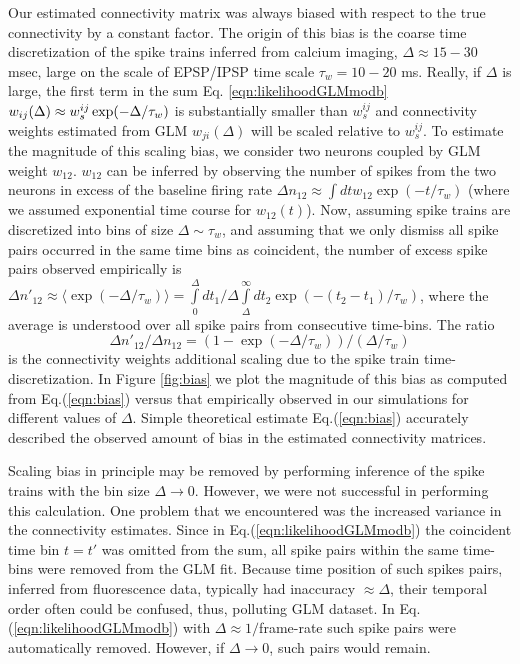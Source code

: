 Our estimated connectivity matrix was always biased with respect to the true connectivity by a constant factor. The origin of this bias is the coarse time discretization of the spike trains inferred from calcium imaging, $\Delta \approx 15-30$ msec, large on the scale of EPSP/IPSP time scale $\tau_w = 10-20$ ms. Really, if $\Delta$ is large, the first term in the sum Eq. \ref{eqn:likelihoodGLMmodb} $w_{ij}(\Delta)\approx w^{ij}_s\exp(-\Delta/\tau_w)$ is substantially smaller than $w^{ij}_s$ and connectivity weights estimated from GLM $w_{ji}(\Delta)$ will be scaled relative to $w_s^{ij}$.
To estimate the magnitude of this scaling bias, we consider two neurons coupled by GLM weight $w_{12}$. $w_{12}$ can be inferred by observing the number of spikes from the two neurons in excess of the baseline firing rate $\Delta n_{12} \approx \int dt w_{12} \exp(-t/\tau_w)$ (where we assumed exponential time course for $w_{12}(t)$). Now, assuming spike trains are discretized into bins of size $\Delta \sim \tau_w$, and assuming that we only dismiss all spike pairs occurred in the same time bins as coincident, the number of excess spike pairs observed empirically is $\Delta n'_{12} \approx \langle \exp(-\Delta/\tau_w) \rangle = \int\limits_0^\Delta {dt_1}/{\Delta} \int\limits_{\Delta}^\infty dt_2 \exp(-(t_2-t_1)/\tau_w)$, where the average is understood over all spike pairs from consecutive time-bins. The ratio
\begin{equation}\label{eqn:bias}
\Delta n'_{12}/\Delta n_{12}=(1-\exp(-\Delta/\tau_w))/(\Delta/\tau_w)
\end{equation}
is the connectivity weights additional scaling due to the spike train time-discretization. In Figure \ref{fig:bias} we plot the magnitude of this bias as computed from Eq.(\ref{eqn:bias}) versus that empirically observed in our simulations for different values of $\Delta$. Simple theoretical estimate Eq.(\ref{eqn:bias}) accurately described the observed amount of bias in the estimated connectivity matrices.

Scaling bias in principle may be removed by performing inference of the spike trains with the bin size $\Delta \rightarrow 0$.
However, we were not successful in performing this calculation.
One problem that we encountered was the increased variance in the connectivity estimates.
Since in Eq.(\ref{eqn:likelihoodGLMmodb}) the coincident time bin $t=t'$ was omitted from the sum, all spike pairs within the same time-bins were removed from the GLM fit.  Because time position of such spikes pairs, inferred from fluorescence data, typically had inaccuracy $\approx \Delta$, their temporal order often could be confused, thus, polluting GLM dataset. In Eq.(\ref{eqn:likelihoodGLMmodb}) with $\Delta \approx 1/$frame-rate such spike pairs were automatically removed. However, if $\Delta \rightarrow 0$, such pairs would remain.

